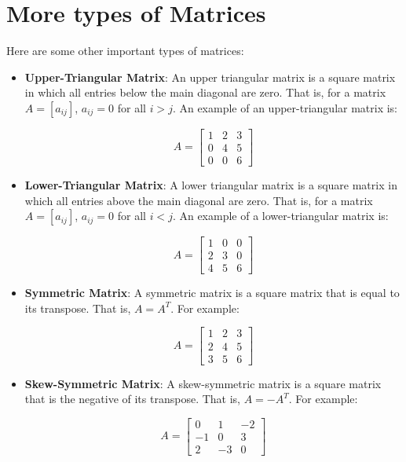 \documentclass{article}
\begin{document}
\section{More types of Matrices}
Here are some other important types of matrices:

\begin{itemize}
    \item \textbf{Upper-Triangular Matrix}: An upper triangular matrix is a square matrix in which all entries below the main diagonal are zero. That is, for a matrix \( A = [a_{ij}] \), \( a_{ij} = 0 \) for all \( i > j \). An example of an upper-triangular matrix is:

    \[
    A = \begin{bmatrix}
    1 & 2 & 3 \\
    0 & 4 & 5 \\
    0 & 0 & 6
    \end{bmatrix}
    \]

    \item \textbf{Lower-Triangular Matrix}: A lower triangular matrix is a square matrix in which all entries above the main diagonal are zero. That is, for a matrix \( A = [a_{ij}] \), \( a_{ij} = 0 \) for all \( i < j \). An example of a lower-triangular matrix is:

    \[
    A = \begin{bmatrix}
    1 & 0 & 0 \\
    2 & 3 & 0 \\
    4 & 5 & 6
    \end{bmatrix}
    \]

    \item \textbf{Symmetric Matrix}: A symmetric matrix is a square matrix that is equal to its transpose. That is, \( A = A^T \). For example:

    \[
    A = \begin{bmatrix}
    1 & 2 & 3 \\
    2 & 4 & 5 \\
    3 & 5 & 6
    \end{bmatrix}
    \]

    \item \textbf{Skew-Symmetric Matrix}: A skew-symmetric matrix is a square matrix that is the negative of its transpose. That is, \( A = -A^T \). For example:

    \[
    A = \begin{bmatrix}
    0 & 1 & -2 \\
    -1 & 0 & 3 \\
    2 & -3 & 0
    \end{bmatrix}
    \]


\end{itemize}
\end{document}
